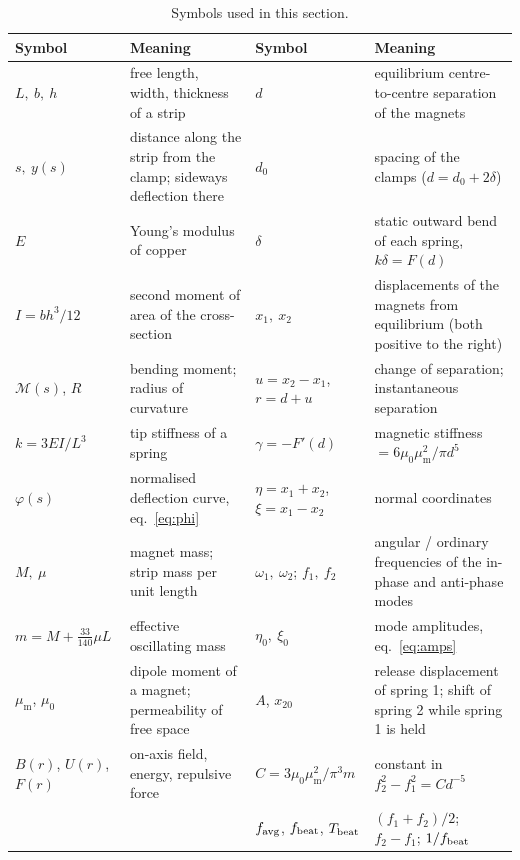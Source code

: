\documentclass[11pt,a4paper]{article}
\newcommand{\muz}{\mu_0}
\newcommand{\mum}{\mu_{\mathrm m}}
\begin{document}
\begin{table}[htbp]
\centering\footnotesize
\caption{Symbols used in this section.}
\label{tab:symbols}
\begin{tabular}{@{}p{2.8cm}p{4.0cm}p{3.2cm}p{4.6cm}@{}}
\toprule
Symbol & Meaning & Symbol & Meaning\\
\midrule
$L,\ b,\ h$ & free length, width, thickness of a strip & $d$ & equilibrium centre-to-centre separation of the magnets\\
$s,\ y(s)$ & distance along the strip from the clamp; sideways deflection there & $d_0$ & spacing of the clamps ($d=d_0+2\delta$)\\
$E$ & Young's modulus of copper & $\delta$ & static outward bend of each spring, $k\delta=F(d)$\\
$I=bh^3/12$ & second moment of area of the cross-section & $x_1,\ x_2$ & displacements of the magnets from equilibrium (both positive to the right)\\
$\mathcal M(s)$, $R$ & bending moment; radius of curvature & $u=x_2-x_1$, $r=d+u$ & change of separation; instantaneous separation\\
$k=3EI/L^3$ & tip stiffness of a spring & $\gamma=-F'(d)$ & magnetic stiffness $=6\muz\mum^2/\pi d^5$\\
$\varphi(s)$ & normalised deflection curve, eq.~\eqref{eq:phi} & $\eta=x_1+x_2$, $\xi=x_1-x_2$ & normal coordinates\\
$M,\ \mu$ & magnet mass; strip mass per unit length & $\omega_1,\ \omega_2$; $f_1,\ f_2$ & angular / ordinary frequencies of the in-phase and anti-phase modes\\
$m=M+\frac{33}{140}\mu L$ & effective oscillating mass & $\eta_0,\ \xi_0$ & mode amplitudes, eq.~\eqref{eq:amps}\\
$\mum$, $\muz$ & dipole moment of a magnet; permeability of free space & $A$, $x_{20}$ & release displacement of spring 1; shift of spring 2 while spring 1 is held\\
$B(r)$, $U(r)$, $F(r)$ & on-axis field, energy, repulsive force & $C=3\muz\mum^2/\pi^3m$ & constant in $f_2^2-f_1^2=Cd^{-5}$\\
& & $f_{\rm avg}$, $f_{\rm beat}$, $T_{\rm beat}$ & $(f_1+f_2)/2$; $f_2-f_1$; $1/f_{\rm beat}$\\
\bottomrule
\end{tabular}
\end{table}
\end{document}

